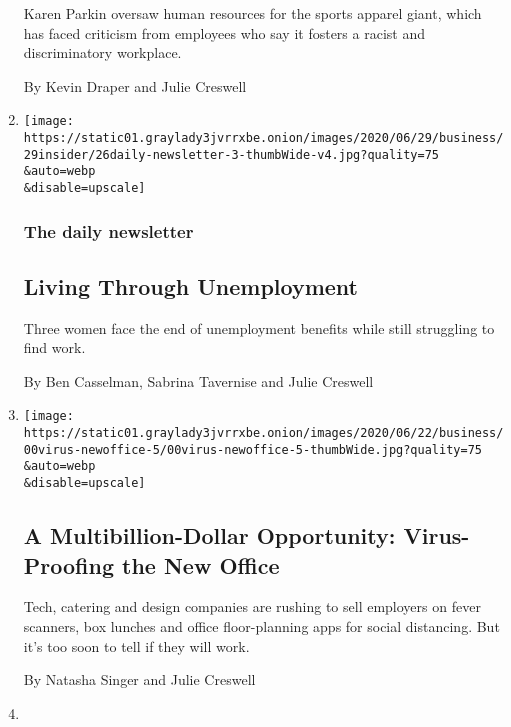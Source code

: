 \begin{enumerate}
  Karen Parkin oversaw human resources for the sports apparel giant,
  which has faced criticism from employees who say it fosters a racist
  and discriminatory workplace.

  By Kevin Draper and Julie Creswell
\item
  \href{/2020/06/26/podcasts/daily-newsletter-unemployment-virus-education.html}{}

  \texttt{[image: https://static01.graylady3jvrrxbe.onion/images/2020/06/29/business/29insider/26daily-newsletter-3-thumbWide-v4.jpg?quality=75\\\&auto=webp\\\&disable=upscale]}

  \hypertarget{the-daily-newsletter}{%
  \subsubsection{The daily newsletter}\label{the-daily-newsletter}}

  \hypertarget{living-through-unemployment}{%
  \subsection{Living Through
  Unemployment}\label{living-through-unemployment}}

  Three women face the end of unemployment benefits while still
  struggling to find work.

  By Ben Casselman, Sabrina Tavernise and Julie Creswell
\item
  \href{/2020/06/22/business/virus-office-workplace-return.html}{}

  \texttt{[image: https://static01.graylady3jvrrxbe.onion/images/2020/06/22/business/00virus-newoffice-5/00virus-newoffice-5-thumbWide.jpg?quality=75\\\&auto=webp\\\&disable=upscale]}

  \hypertarget{a-multibillion-dollar-opportunity-virus-proofing-the-new-office}{%
  \subsection{A Multibillion-Dollar Opportunity: Virus-Proofing the New
  Office}\label{a-multibillion-dollar-opportunity-virus-proofing-the-new-office}}

  Tech, catering and design companies are rushing to sell employers on
  fever scanners, box lunches and office floor-planning apps for social
  distancing. But it's too soon to tell if they will work.

  By Natasha Singer and Julie Creswell
\item
  \href{/2020/06/10/business/adidas-black-employees-discrimination.html}{}


\end{enumerate}
